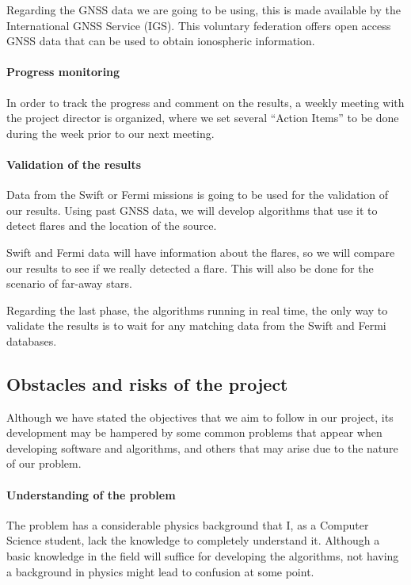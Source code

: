 \documentclass[12pt]{article}
\begin{document}
Regarding the GNSS data we are going to be using, this is made available by the  International GNSS Service (IGS). This voluntary federation offers open access GNSS data that can be used to obtain ionospheric information. \cite{hernandez2009igs}

\paragraph{Progress monitoring}

In order to track the progress and comment on the results, a weekly meeting with the project director is organized, where we set several “Action Items” to be done during the week prior to our next meeting.

\paragraph{Validation of the results}

Data from the Swift or Fermi missions is going to be used for the validation of our results. Using past GNSS data, we will develop algorithms that use it to detect flares and the location of the source. 

Swift and Fermi data will have information about the flares, so we will compare our results to see if we really detected a flare. This will also be done for the scenario of far-away stars.

Regarding the last phase, the algorithms running in real time, the only way to validate the results is to wait for any matching data from the Swift and Fermi databases.

\subsection{Obstacles and risks of the project}

Although we have stated the objectives that we aim to follow in our project, its development may be hampered by some common problems that appear when developing software and algorithms, and others that may arise due to the nature of our problem.

\paragraph{Understanding of the problem}

The problem has a considerable physics background that I, as a Computer Science student, lack the knowledge to completely understand it. Although a basic knowledge in the field will suffice for developing the algorithms, not having a background in physics might lead to confusion at some point.
\end{document}
